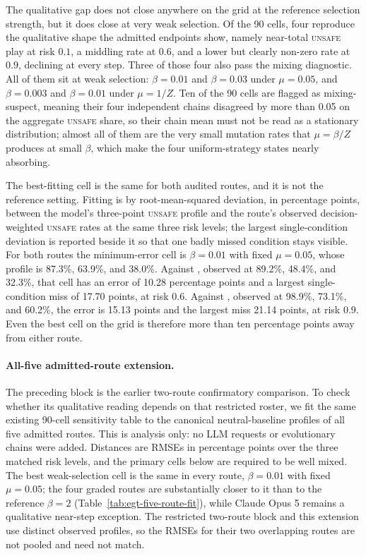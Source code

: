 \documentclass[sigconf,anonymous]{aamas}
\newcommand{\Unsafe}{\textsc{unsafe}}
\begin{document}
The qualitative gap does not close anywhere on the grid at the reference
selection strength, but it does close at very weak selection. Of the 90 cells,
four reproduce the qualitative shape the admitted endpoints show, namely
near-total \Unsafe{} play at risk $0.1$, a middling rate at $0.6$, and a lower
but clearly non-zero rate at $0.9$, declining at every step. Three of those
four also pass the mixing diagnostic. All of them sit at weak selection:
$\beta = 0.01$ and $\beta = 0.03$ under $\mu = 0.05$, and $\beta = 0.003$ and
$\beta = 0.01$ under $\mu = 1/Z$. Ten of the 90 cells are flagged as
mixing-suspect, meaning their four independent chains disagreed by more than
0.05 on the aggregate \Unsafe{} share, so their chain mean must not be read as
a stationary distribution; almost all of them are the very small mutation
rates that $\mu = \beta/Z$ produces at small $\beta$, which make the four
uniform-strategy states nearly absorbing.

The best-fitting cell is the same for both audited routes, and it is not the
reference setting. Fitting is by root-mean-squared deviation, in percentage
points, between the model's three-point \Unsafe{} profile and the route's
observed decision-weighted \Unsafe{} rates at the same three risk levels; the
largest single-condition deviation is reported beside it so that one badly
missed condition stays visible. For both routes the minimum-error cell is
    $\beta = 0.01$ with fixed $\mu = 0.05$, whose profile is 87.3\%, 63.9\%, and
    38.0\%. Against , observed at 89.2\%,
    48.4\%, and 32.3\%, that cell has an error of 10.28 percentage points and a
largest single-condition miss of 17.70 points, at risk $0.6$. Against
    , observed at 98.9\%, 73.1\%, and 60.2\%,
the error is 15.13 points and the largest miss 21.14 points, at risk $0.9$.
Even the best cell on the grid is therefore more than ten percentage points
away from either route.

\paragraph{All-five admitted-route extension.} The preceding block is the
earlier two-route confirmatory comparison. To check whether its qualitative
reading depends on that restricted roster, we fit the same existing 90-cell
sensitivity table to the canonical neutral-baseline profiles of all five
admitted routes. This is analysis only: no LLM requests or evolutionary chains
were added. Distances are RMSEs in percentage points over the three matched
risk levels, and the primary cells below are required to be well mixed. The
best weak-selection cell is the same in every route, $\beta=0.01$ with fixed
$\mu=0.05$; the four graded routes are substantially closer to it than to the
reference $\beta=2$ (Table~\ref{tab:egt-five-route-fit}), while Claude Opus 5
remains a qualitative near-step exception.
The restricted two-route block and this extension use distinct observed
profiles, so the RMSEs for their two overlapping routes are not pooled and need
not match.
\end{document}
